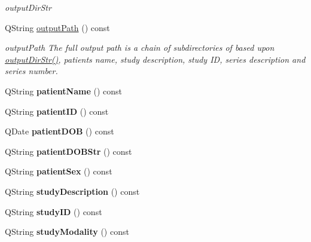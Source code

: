 \begin{DoxyCompactItemize}
\begin{DoxyCompactList}\small\item\em output\+Dir\+Str \end{DoxyCompactList}\item 
Q\+String \hyperlink{class_series_info_a7088530574522d3d1123806c766402f2}{output\+Path} () const
\begin{DoxyCompactList}\small\item\em output\+Path The full output path is a chain of subdirectories of based upon \hyperlink{class_series_info_abc897c5c859293338e45d193ac62c674}{output\+Dir\+Str()}, patient\textquotesingle{}s name, study description, study ID, series description and series number. \end{DoxyCompactList}\item 
\mbox{\label{class_series_info_ae6eda4a724007bddd85b5b6832648590}} 
Q\+String {\bfseries patient\+Name} () const
\item 
\mbox{\label{class_series_info_a5b04d7095b2bf6728bc02e5f5fd9964a}} 
Q\+String {\bfseries patient\+ID} () const
\item 
\mbox{\label{class_series_info_a6718f39279d903a522c6c7e6dc9558b7}} 
Q\+Date {\bfseries patient\+D\+OB} () const
\item 
\mbox{\label{class_series_info_ad2d4cfc6d71e16b8f44910937dad7d8a}} 
Q\+String {\bfseries patient\+D\+O\+B\+Str} () const
\item 
\mbox{\label{class_series_info_a4330c792ea2a959d442139856afe783d}} 
Q\+String {\bfseries patient\+Sex} () const
\item 
\mbox{\label{class_series_info_af6564a18ffa1fbddcf32d273dac430f9}} 
Q\+String {\bfseries study\+Description} () const
\item 
\mbox{\label{class_series_info_ac29186ca4e8d7703dbf2da4dac3871cf}} 
Q\+String {\bfseries study\+ID} () const
\item 
\mbox{\label{class_series_info_ad6b4be6ab8b9c1bf2377e98c5d1ffb31}} 
Q\+String {\bfseries study\+Modality} () const
\item 

\end{DoxyCompactItemize}
